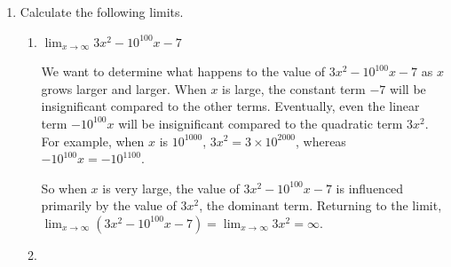 \documentclass{article}
\begin{document}
\begin{enumerate}
\begin{solution}
  \end{solution}

\item  Calculate the following limits. 

  \begin{enumerate}

  \item


    \begin{problem}[\vfill\newpage]
      $\displaystyle \lim_{x \to \infty} 3x^2 - 10^{100} x - 7$
    \end{problem}

    \begin{solution}
      We want to determine what happens to the value of $3x^2 - 10^{100} x - 7$ as $x$ grows larger and larger.
      When $x$ is large, the constant term $-7$ will be insignificant compared to the other terms. Eventually,
      even the linear term $-10^{100}x$ will be insignificant compared to the quadratic term $3x^2$. For example,
      when $x$ is $10^{1000}$, $3x^2=3\times 10^{2000}$, whereas $-10^{100}x = -10^{1100}$. 
      
      So when $x$ is very large, the value of $3x^2 - 10^{100}x - 7$ is influenced primarily by the value of $3x^2$, 
      the dominant term. Returning to the limit,
      $\displaystyle \lim_{x \to \infty} (3x^2-10^{100}x-7) = \lim_{x\to \infty} 3x^2=\infty$. 
    \end{solution}

  \item


\end{enumerate}
\end{enumerate}
\end{document}
